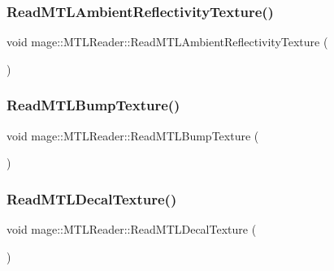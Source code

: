\subsubsection{\texorpdfstring{Read\+M\+T\+L\+Ambient\+Reflectivity\+Texture()}{ReadMTLAmbientReflectivityTexture()}}
{\footnotesize\ttfamily void mage\+::\+M\+T\+L\+Reader\+::\+Read\+M\+T\+L\+Ambient\+Reflectivity\+Texture (\begin{DoxyParamCaption}{ }\end{DoxyParamCaption})\hspace{0.3cm}{\ttfamily [private]}}

\hypertarget{classmage_1_1_m_t_l_reader_acf7aacf933f842d3e14af92d161acd5b}{}\label{classmage_1_1_m_t_l_reader_acf7aacf933f842d3e14af92d161acd5b} 
\subsubsection{\texorpdfstring{Read\+M\+T\+L\+Bump\+Texture()}{ReadMTLBumpTexture()}}
{\footnotesize\ttfamily void mage\+::\+M\+T\+L\+Reader\+::\+Read\+M\+T\+L\+Bump\+Texture (\begin{DoxyParamCaption}{ }\end{DoxyParamCaption})\hspace{0.3cm}{\ttfamily [private]}}

\hypertarget{classmage_1_1_m_t_l_reader_a578df3a55c79fba9d46616791b2e5539}{}\label{classmage_1_1_m_t_l_reader_a578df3a55c79fba9d46616791b2e5539} 
\subsubsection{\texorpdfstring{Read\+M\+T\+L\+Decal\+Texture()}{ReadMTLDecalTexture()}}
{\footnotesize\ttfamily void mage\+::\+M\+T\+L\+Reader\+::\+Read\+M\+T\+L\+Decal\+Texture (\begin{DoxyParamCaption}{ }\end{DoxyParamCaption})\hspace{0.3cm}{\ttfamily [private]}}

\hypertarget{classmage_1_1_m_t_l_reader_accd087a8e5b2d489b83f70ecf0fe0d18}{}\label{classmage_1_1_m_t_l_reader_accd087a8e5b2d489b83f70ecf0fe0d18} 
